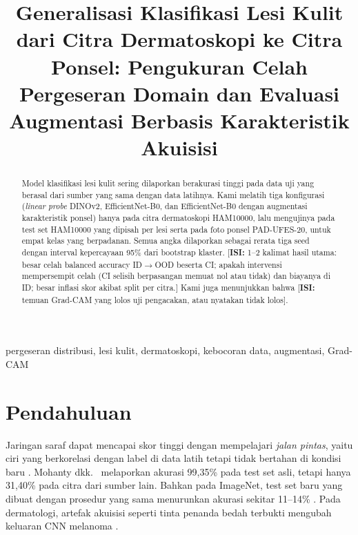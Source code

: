 \documentclass[conference]{IEEEtran}
\newif\ifdraft \drafttrue
\newcommand{\TODO}[1]{\ifdraft{\color{red}[\textbf{ISI:} #1]}\else{\color{red}[TODO BELUM DIISI]}\fi}
\begin{document}
\title{Generalisasi Klasifikasi Lesi Kulit dari Citra Dermatoskopi ke Citra Ponsel: Pengukuran Celah Pergeseran Domain dan Evaluasi Augmentasi Berbasis Karakteristik Akuisisi}

\author{
}
\maketitle

\begin{abstract}
Model klasifikasi lesi kulit sering dilaporkan berakurasi tinggi pada data uji yang berasal dari sumber yang sama dengan data latihnya. Kami melatih tiga konfigurasi (\emph{linear probe} DINOv2, EfficientNet-B0, dan EfficientNet-B0 dengan augmentasi karakteristik ponsel) hanya pada citra dermatoskopi HAM10000, lalu mengujinya pada test set HAM10000 yang dipisah per lesi serta pada foto ponsel PAD-UFES-20, untuk empat kelas yang berpadanan. Semua angka dilaporkan sebagai rerata tiga seed dengan interval kepercayaan 95\% dari bootstrap klaster. \TODO{1--2 kalimat hasil utama: besar celah balanced accuracy ID$\rightarrow$OOD beserta CI; apakah intervensi mempersempit celah (CI selisih berpasangan memuat nol atau tidak) dan biayanya di ID; besar inflasi skor akibat split per citra.} Kami juga menunjukkan bahwa \TODO{temuan Grad-CAM yang lolos uji pengacakan, atau nyatakan tidak lolos}.
\end{abstract}

\begin{IEEEkeywords}
pergeseran distribusi, lesi kulit, dermatoskopi, kebocoran data, augmentasi, Grad-CAM
\end{IEEEkeywords}

\section{Pendahuluan}
Jaringan saraf dapat mencapai skor tinggi dengan mempelajari \emph{jalan pintas}, yaitu ciri yang berkorelasi dengan label di data latih tetapi tidak bertahan di kondisi baru \cite{geirhos2020shortcut}. Mohanty dkk.\ \cite{mohanty2016plant} melaporkan akurasi 99,35\% pada test set asli, tetapi hanya 31,40\% pada citra dari sumber lain. Bahkan pada ImageNet, test set baru yang dibuat dengan prosedur yang sama menurunkan akurasi sekitar 11--14\% \cite{recht2019imagenet}. Pada dermatologi, artefak akuisisi seperti tinta penanda bedah terbukti mengubah keluaran CNN melanoma \cite{winkler2019markings}.
\end{document}

